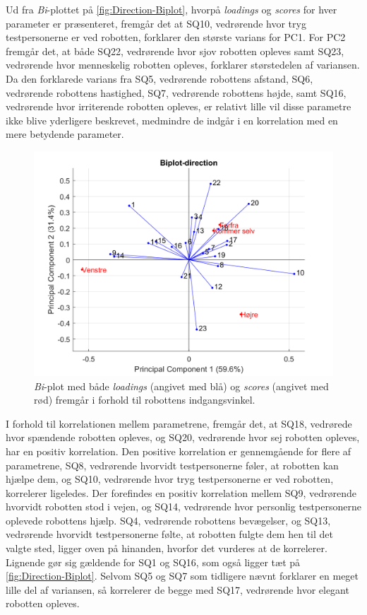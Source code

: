 \noindent
%
Ud fra \textit{Bi}-plottet på \autoref{fig:Direction-Biplot}, hvorpå \textit{loadings} og \textit{scores} for hver parameter er præsenteret, fremgår det at SQ10, vedrørende hvor tryg testpersonerne er ved robotten, forklarer den største varians for PC1. For PC2 fremgår det, at både SQ22, vedrørende hvor sjov robotten opleves samt SQ23, vedrørende hvor menneskelig robotten opleves, forklarer størstedelen af variansen. Da den forklarede varians fra SQ5, vedrørende robottens afstand, SQ6, vedrørende robottens hastighed, SQ7, vedrørende robottens højde, samt SQ16, vedrørende hvor irriterende robotten opleves, er relativt lille vil disse parametre ikke blive yderligere beskrevet, medmindre de indgår i en korrelation med en mere betydende parameter.  
%
\begin{figure}[H]
\centering
\includegraphics[width=\textwidth]{Figure/DatabehandlingSkalaer/PCAfigures/Direction-Biplot.png}
\caption{\textit{Bi}-plot med både \textit{loadings} (angivet med blå) og \textit{scores} (angivet med rød) fremgår i forhold til robottens indgangsvinkel.}
\label{fig:Direction-Biplot}
\end{figure}
\noindent
%
I forhold til korrelationen mellem parametrene, fremgår det, at SQ18, vedrørede hvor spændende robotten opleves, og SQ20, vedrørende hvor sej robotten opleves, har en positiv korrelation. Den positive korrelation er gennemgående for flere af parametrene, SQ8, vedrørende hvorvidt testpersonerne føler, at robotten kan hjælpe dem, og SQ10, vedrørende hvor tryg testpersonerne er ved robotten, korrelerer ligeledes. Der forefindes en positiv korrelation mellem SQ9, vedrørende hvorvidt robotten stod i vejen, og SQ14, vedrørende hvor personlig testpersonerne oplevede robottens hjælp. SQ4, vedrørende robottens bevægelser, og SQ13, vedrørende hvorvidt testpersonerne følte, at robotten fulgte dem hen til det valgte sted, ligger oven på hinanden, hvorfor det vurderes at de korrelerer. Lignende gør sig gældende for SQ1 og SQ16, som også ligger tæt på \autoref{fig:Direction-Biplot}. Selvom SQ5 og SQ7 som tidligere nævnt forklarer en meget lille del af variansen, så korrelerer de begge med SQ17, vedrørende hvor elegant robotten opleves.   

